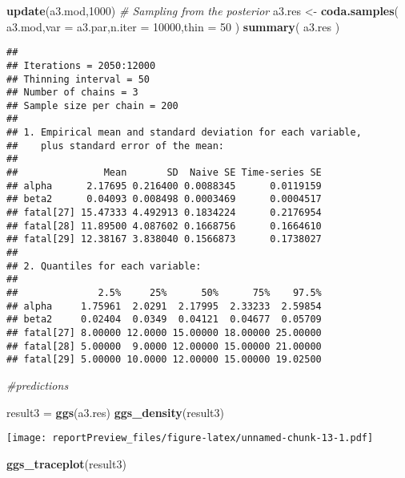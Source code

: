 \documentclass[]{article}
\newenvironment{Shaded}{\begin{snugshade}}{\end{snugshade}}
\newcommand{\KeywordTok}[1]{\textcolor[rgb]{0.13,0.29,0.53}{\textbf{#1}}}
\newcommand{\DataTypeTok}[1]{\textcolor[rgb]{0.13,0.29,0.53}{#1}}
\newcommand{\DecValTok}[1]{\textcolor[rgb]{0.00,0.00,0.81}{#1}}
\newcommand{\StringTok}[1]{\textcolor[rgb]{0.31,0.60,0.02}{#1}}
\newcommand{\CommentTok}[1]{\textcolor[rgb]{0.56,0.35,0.01}{\textit{#1}}}
\newcommand{\NormalTok}[1]{#1}
\begin{document}
\begin{Shaded}
\begin{Highlighting}[]
 \KeywordTok{update}\NormalTok{(a3.mod,}\DecValTok{1000}\NormalTok{)}
 \CommentTok{# Sampling from the posterior}
\NormalTok{ a3.res <-}\StringTok{ }\KeywordTok{coda.samples}\NormalTok{( a3.mod,}\DataTypeTok{var =}\NormalTok{ a3.par,}\DataTypeTok{n.iter =} \DecValTok{10000}\NormalTok{,}\DataTypeTok{thin =} \DecValTok{50}\NormalTok{ )}
 \KeywordTok{summary}\NormalTok{( a3.res )}
\end{Highlighting}
\end{Shaded}

\begin{verbatim}
## 
## Iterations = 2050:12000
## Thinning interval = 50 
## Number of chains = 3 
## Sample size per chain = 200 
## 
## 1. Empirical mean and standard deviation for each variable,
##    plus standard error of the mean:
## 
##               Mean       SD  Naive SE Time-series SE
## alpha      2.17695 0.216400 0.0088345      0.0119159
## beta2      0.04093 0.008498 0.0003469      0.0004517
## fatal[27] 15.47333 4.492913 0.1834224      0.2176954
## fatal[28] 11.89500 4.087602 0.1668756      0.1664610
## fatal[29] 12.38167 3.838040 0.1566873      0.1738027
## 
## 2. Quantiles for each variable:
## 
##              2.5%     25%      50%      75%    97.5%
## alpha     1.75961  2.0291  2.17995  2.33233  2.59854
## beta2     0.02404  0.0349  0.04121  0.04677  0.05709
## fatal[27] 8.00000 12.0000 15.00000 18.00000 25.00000
## fatal[28] 5.00000  9.0000 12.00000 15.00000 21.00000
## fatal[29] 5.00000 10.0000 12.00000 15.00000 19.02500
\end{verbatim}

\begin{Shaded}
\begin{Highlighting}[]
 \CommentTok{#predictions}
\end{Highlighting}
\end{Shaded}

\begin{Shaded}
\begin{Highlighting}[]
\NormalTok{result3 =}\StringTok{ }\KeywordTok{ggs}\NormalTok{(a3.res)}
\KeywordTok{ggs_density}\NormalTok{(result3)}
\end{Highlighting}
\end{Shaded}

\texttt{[image: reportPreview\_files/figure-latex/unnamed-chunk-13-1.pdf]}

\begin{Shaded}
\begin{Highlighting}[]
\KeywordTok{ggs_traceplot}\NormalTok{(result3)}
\end{Highlighting}
\end{Shaded}
\end{document}
